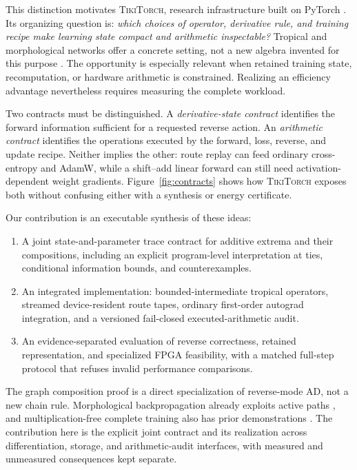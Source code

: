 \documentclass{article}
\theoremstyle{plain}
\theoremstyle{definition}
\theoremstyle{remark}
\newcommand{\ttorch}{\textsc{TikiTorch}}
\begin{document}
This distinction motivates \ttorch{}, research infrastructure built on
PyTorch \citep{paszke2019pytorch}. Its organizing question is:
\emph{which choices of operator, derivative rule, and training recipe make
learning state compact and arithmetic inspectable?} Tropical and
morphological networks offer a concrete setting, not a new algebra invented
for this purpose \citep{ritter1996morphological,zhang2018tropical,franchi2020morphological}.
The opportunity is especially relevant when retained training state,
recomputation, or hardware arithmetic is constrained. Realizing an efficiency
advantage nevertheless requires measuring the complete workload.

Two contracts must be distinguished. A \emph{derivative-state contract}
identifies the forward information sufficient for a requested reverse
action. An \emph{arithmetic contract} identifies the operations executed by
the forward, loss, reverse, and update recipe. Neither implies the other:
route replay can feed ordinary cross-entropy and AdamW, while a shift--add
linear forward can still need activation-dependent weight gradients.
Figure~\ref{fig:contracts} shows how \ttorch{} exposes both without confusing
either with a synthesis or energy certificate.

Our contribution is an executable synthesis of these ideas:
\begin{enumerate}
\item A joint state-and-parameter trace contract for additive extrema and
their compositions, including an explicit program-level interpretation at
ties, conditional information bounds, and counterexamples.
\item An integrated implementation: bounded-intermediate tropical operators,
streamed device-resident route tapes, ordinary first-order autograd
integration, and a versioned fail-closed executed-arithmetic audit.
\item An evidence-separated evaluation of reverse correctness, retained
representation, and specialized FPGA feasibility, with a matched full-step
protocol that refuses invalid performance comparisons.
\end{enumerate}

The graph composition proof is a direct specialization of reverse-mode AD,
not a new chain rule. Morphological backpropagation already exploits active
paths \citep{groenendijk2023geometric}, and multiplication-free complete
training also has prior demonstrations \citep{kosson2023multiplicationfree}.
The contribution here is the explicit joint contract and its realization
across differentiation, storage, and arithmetic-audit interfaces, with
measured and unmeasured consequences kept separate.
\end{document}
